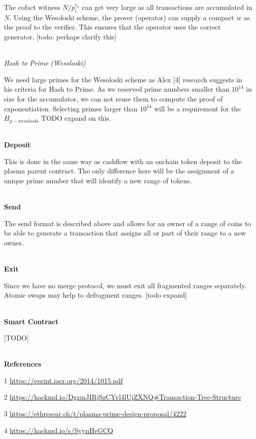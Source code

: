 \documentclass[12pt]{article}
\begin{document}
The cofact witness $N/p_i^{e_k}$ can get very large as all transactions are accumulated in $N$. Using the Wesoloski scheme, the prover (operator) can supply a compact $w$ as the proof to the verifier. This ensures that the operator uses the correct generator. [todo: perhaps clarify this]
\\
\\
\centerline{\textit{Hash to Prime (Wesoloski)}}

We need large primes for the Wesoloski scheme as Alex [4] research suggests in his criteria for Hash to Prime. As we reserved prime numbers smaller than $10^14$ in size for the accumulator, we can not reuse them to compute the proof of exponentiation. Selecting primes larger than $10^14$ will be a requirement for the $H_{p-wesoloski}$ TODO expand on this. 
\\ 
\\
\centerline{\textbf{Deposit}}

This is done in the same way as cashflow with an onchain token deposit to the plasma parent contract. The only difference here will be the assignment of a unique prime number that will identify a new range of tokens. 
\\
\\
\centerline{\textbf{Send}}

The send format is described above and allows for an owner of a range of coins to be able to generate a transaction that assigns all or part of their range to a new owner. 
\\
\\
\centerline{\textbf{Exit}}

Since we have no merge protocol, we must exit all fragmented ranges separately. Atomic swaps may help to defragment ranges. [todo expand]
\\
\\
\centerline{\textbf{Smart Contract}}

[TODO]
\\
\\
\centerline{\textbf{References}}

1 \url{https://eprint.iacr.org/2014/1015.pdf}

2 \url{https://hackmd.io/DgzmJIRjSzCYvl4lUjZXNQ#Transaction-Tree-Structure}

3 \url{https://ethresear.ch/t/plasma-prime-design-proposal/4222}

4 \url{https://hackmd.io/s/SyynHeGCQ}
\end{document}
